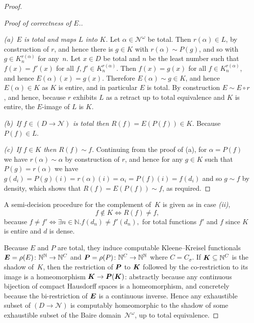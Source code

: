 \documentclass{LMCS}
\newcommand{\myomega}{\omega}
\newcommand{\N}{\mathbb{N}}
\newcommand{\pN}{\mathcal{N}}
\newcommand{\comp}{\circ}
\newcommand{\sK}{\operatorname{\text{\boldmath{$K$}}}}
\newcommand{\sP}{\operatorname{\text{\boldmath{$P$}}}}
\newcommand{\sE}{\operatorname{\text{\boldmath{$E$}}}}
\begin{document}
\begin{proof}
\pagebreak[3]
\begin{proof}[Proof of correctness of $E$.]
~

\emph{(a)~$E$ is total and maps $L$ into $K$.} 
Let $\alpha \in \pN^\omega$ be total.  Then $r(\alpha) \in L$, by
construction of $r$, and hence there is $g \in K$ with $r(\alpha) \sim
P(g)$, and so with $g \in K_n^{r(\alpha)}$ for any~$n$. Let $x \in D$
be total and $n$ be the least number such that $f(x)=f'(x)$ for all
$f,f' \in K_n^{r(\alpha)}$. Then $f(x)=g(x)$ for all $f \in
K_n^{r(\alpha)}$, and hence $E(\alpha)(x)=g(x)$.  Therefore $E(\alpha)
\sim g \in K$, and hence $E(\alpha) \in K$ as $K$ is entire, and in
particular $E$ is total.  By construction $E \sim E \comp r$, and
hence, because $r$ exhibits $L$ as a retract up to total equivalence
and $K$ is entire, the $E$-image of $L$ is $K$.

\medskip
\emph{(b)~If $f \in (D \to \pN)$ is total then $R(f)=E(P(f)) \in
    K$.} 
Because $P(f) \in L$.

\medskip
\emph{(c)~If $f \in K$ then $R(f) \sim f$.} 
Continuing from the proof of (a), for $\alpha=P(f)$ we have $r(\alpha)
\sim \alpha$ by construction of $r$, and hence for any $g \in K$ such
that $P(g) = r(\alpha)$ we have $g(d_i) = P(g)(i)=r(\alpha)(i) =
\alpha_i = P(f)(i) = f(d_i)$ and so $g \sim f$ by density, which shows
that $R(f)=E(P(f)) \sim f$, as required.
\end{proof}

\medskip

A semi-decision procedure for the complement of~$K$ is
given as in case \emph{(ii)},
\[
f \not\in K \iff R(f) \ne f,
\]
because 
$
f \ne f' \iff \exists n \in \N. f(d_n) \ne f'(d_n),
$
for total functions $f'$ and $f$ since $K$ is entire and $d$ is dense.

Because $E$ and $P$ are total, they induce computable Kleene--Kreisel
functionals $\sE = \rho(E) \colon \N^\N \to \N^{C}$ and $\sP = \rho(P)
\colon \N^{C} \to \N^\N$ where $C=C_{\sigma}$. If $\sK \subseteq
\N^{C}$ is the shadow of~$K$, then the restriction of $\sP$ to $\sK$
followed by the co-restriction to its image is a homeomorphism $\sK
\to \sP(\sK)$: abstractly because any continuous bijection of compact
Hausdorff spaces is a homeomorphism, and concretely because the
bi-restriction of $\sE$ is a continuous inverse.  Hence any
exhaustible subset of $(D \to \pN)$ is computably homeomorphic to the
shadow of some exhaustible subset of the Baire domain~$\pN^\myomega$,
up to total equivalence.

\medskip


\end{proof}
\end{document}
